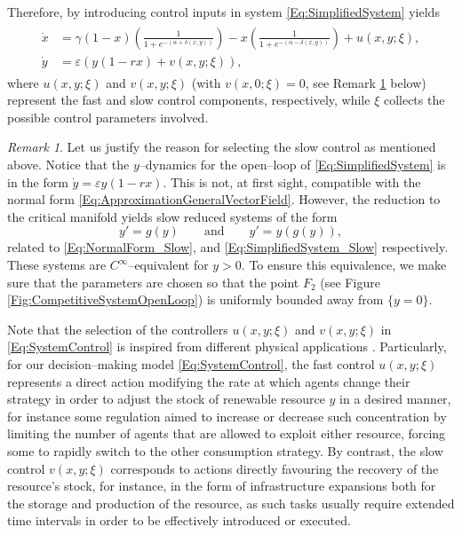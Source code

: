 \documentclass[3p]{elsarticle}
\theoremstyle{plain}
\theoremstyle{remark}
\newtheorem{remark}{Remark}
\theoremstyle{definition}
\begin{document}
    
Therefore, by introducing control inputs in system \eqref{Eq:SimplifiedSystem} yields
    \begin{align}
        \begin{split}
            \dot{x} &= \gamma(1-x)\left( \frac{1}{1+e^{-(\alpha + \delta(x,y))}} \right) - x\left( \frac{1}{1+e^{-(\alpha-\delta(x,y))}} \right) + u(x,y;\xi),\\
            \dot{y} &= \varepsilon\left( y (1-rx) +  v(x,y;\xi) \right),
            \label{Eq:SystemControl}
        \end{split}
    \end{align}
    where $u(x, y;\xi)$ and $v(x,y;\xi)$ (with $v(x,0;\xi)=0$, see Remark \ref{Rem:GraphC0} below) represent the fast and slow control components, respectively, while $\xi$ collects the possible control parameters involved. 
    
    \begin{remark}
    \label{Rem:GraphC0}
        Let us justify the reason for selecting the slow control as mentioned above. Notice that the $y$--dynamics for the open--loop of \eqref{Eq:SimplifiedSystem} is in the form $\dot y=\varepsilon y(1-rx)$. This is not, at first sight, compatible with the normal form \eqref{Eq:ApproximationGeneralVectorField}. However, the reduction to the critical manifold yields slow reduced systems of the form
        \begin{equation}
            y'=g(y) \qquad \text{and} \qquad y'=y(g(y)),
        \end{equation}
        related to \eqref{Eq:NormalForm_Slow}, and  \eqref{Eq:SimplifiedSystem_Slow} respectively. These systems are $C^\infty$--equivalent for $y>0$. To ensure this equivalence, we make sure that the parameters are chosen so that the point $F_2$ (see Figure \ref{Fig:CompetitiveSystemOpenLoop}) is uniformly bounded away from $\{y=0\}$.
    \end{remark}
    
    Note that the selection of the controllers $u(x,y;\xi)$ and $ v(x,y;\xi)$ in \eqref{Eq:SystemControl} is inspired from different physical applications \cite{Ref:Durham2008, Ref:Izhikevich2006, Ref:Ermentrout2010, Ref:JardonKojakhmetov2019}. Particularly, for our decision--making model \eqref{Eq:SystemControl}, the fast control $u(x,y;\xi)$ represents a direct action modifying the rate at which agents change their strategy in order to adjust the stock of renewable resource $y$ in a desired manner, for instance 
    some regulation aimed to increase or decrease such concentration by limiting the number of agents that are allowed to exploit either resource, forcing some to rapidly switch to the other consumption strategy. By contrast, the slow control $v(x,y;\xi)$ corresponds to actions directly favouring the recovery of the resource's stock, for instance, in the form of infrastructure expansions both for the storage and production of the resource, as such tasks usually require extended time intervals in order to be effectively introduced or executed.
    
\end{document}
